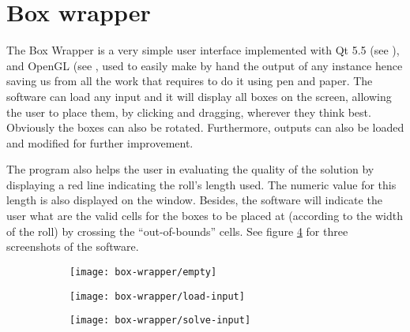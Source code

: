 \section{Box wrapper}
\label{sec:box-wrapper}

The Box Wrapper is a very simple user interface implemented with Qt 5.5
(see \cite{Qt5.5WEB}), and OpenGL (see \cite{OpenGLWEB}, used to easily
make by hand the output of any instance hence saving us from all the work
that requires to do it using pen and paper. The software can load any input
and it will display all boxes on the screen, allowing the user to place
them, by clicking and dragging, wherever they think best. Obviously the
boxes can also be rotated. Furthermore, outputs can also be loaded and
modified for further improvement.

\hfill

The program also helps the user in evaluating the quality of the solution
by displaying a red line indicating the roll's length used. The numeric
value for this length is also displayed on the window. Besides, the software
will indicate the user what are the valid cells for the boxes to be placed
at (according to the width of the roll) by crossing the ``out-of-bounds''
cells. See figure \ref{fig:box-wrapper-screenshots} for three screenshots
of the software.

\begin{figure}[H]
\centering
	\begin{subfigure}{0.3\textwidth}
		\centering
		\texttt{[image: box-wrapper/empty]}
		\label{fig:box-wrapper-screenshots:A}
	\end{subfigure}
	\begin{subfigure}{0.3\textwidth}
		\centering
		\texttt{[image: box-wrapper/load-input]}
		\label{fig:box-wrapper-screenshots:B}
	\end{subfigure}
	\begin{subfigure}{0.3\textwidth}
		\centering
		\texttt{[image: box-wrapper/solve-input]}
		\label{fig:box-wrapper-screenshots:C}
	\end{subfigure}
	\label{fig:box-wrapper-screenshots}
\end{figure}